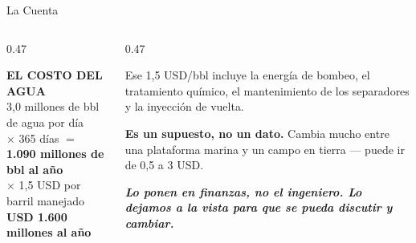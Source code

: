 \documentclass[aspectratio=169, 11pt]{beamer}
\begin{document}
\begin{frame}[shrink=8]{La Cuenta}
  \vspace{2pt}
  \begin{columns}[T]
    \begin{column}{0.47\textwidth}
      \begin{tcolorbox}[colback=arcaGray, colframe=arcaRed, boxrule=0pt,
        leftrule=4pt, arc=3pt, left=9pt, right=9pt, top=7pt, bottom=7pt]
        {\scriptsize\color{arcaRed}\bfseries EL COSTO DEL AGUA}\\[6pt]
        {\footnotesize\color{textMuted}
         3,0 millones de bbl de agua por día\\[3pt]
         $\times$ 365 días $=$ \textbf{1.090 millones de bbl al año}\\[3pt]
         $\times$ 1,5 USD por barril manejado\\[7pt]}
        {\large\color{arcaRed}\bfseries USD 1.600 millones al año}
      \end{tcolorbox}
    \end{column}
    \begin{column}{0.47\textwidth}
      {\footnotesize\color{textMuted}
       Ese 1,5 USD/bbl incluye la energía de bombeo, el tratamiento químico,
       el mantenimiento de los separadores y la inyección de vuelta.
       \vspace{7pt}

       \textbf{Es un supuesto, no un dato.} Cambia mucho entre una plataforma
       marina y un campo en tierra --- puede ir de 0,5 a 3 USD.}
      \vspace{7pt}

      {\footnotesize\color{arcaDark}\bfseries\itshape
       Lo ponen en finanzas, no el ingeniero. Lo dejamos a la vista para que
       se pueda discutir y cambiar.}
    \end{column}
  \end{columns}
\end{frame}
\end{document}
